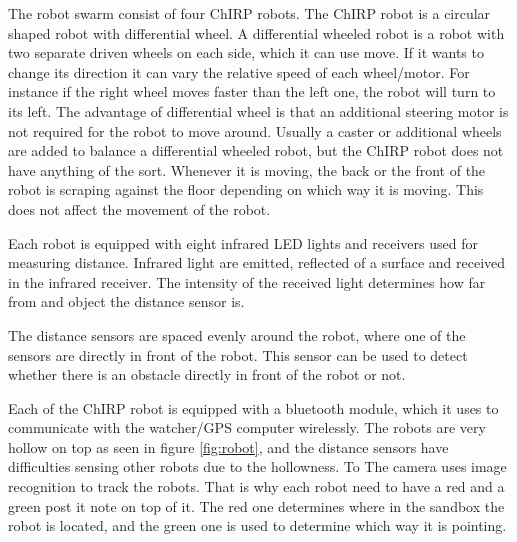 The robot swarm consist of four ChIRP robots. The ChIRP robot is a circular shaped robot with differential wheel. A differential wheeled robot is a robot with two separate driven wheels on each side, which it can use move. If it wants to change its direction it can vary the relative speed of each wheel/motor. For instance if the right wheel moves faster than the left one, the robot will turn to its left. The advantage of differential wheel is that an additional steering motor is not required for the robot to move around. Usually a caster or additional wheels are added to balance a differential wheeled robot, but the ChIRP robot does not have anything of the sort. Whenever it is moving, the back or the front of the robot is scraping against the floor depending on which way it is moving. This does not affect the movement of the robot.

Each robot is equipped with eight infrared LED lights and receivers used for measuring distance. Infrared light are emitted, reflected of a surface and received in the infrared receiver. The intensity of the received light determines how far from and object the distance sensor is.

The distance sensors are spaced evenly around the robot, where one of the sensors are directly in front of the robot. This sensor can be used to detect whether there is an obstacle directly in front of the robot or not.

Each of the ChIRP robot is equipped with a bluetooth module, which it uses to communicate with the watcher/GPS computer wirelessly. 
The robots are very hollow on top as seen in figure \ref{fig:robot}, and the distance sensors have difficulties sensing other robots due to the hollowness. To 
The camera uses image recognition to track the robots. That is why each robot need to have a red and a green post it note on top of it. The red one determines where in the sandbox the robot is located, and the green one is used to determine which way it is pointing. 


